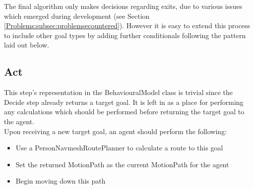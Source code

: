 The final algorithm only makes decisions regarding exits, due to various issues which emerged during development (see Section \ref{Problems:subsec:problemsecountered}). However it is easy to extend this process to include other goal types by adding further conditionals following the pattern laid out below.\\

\begin{algorithm}[H]
 \SetAlgoLined
\end{algorithm}

\subsection{Act}
\label{Imp:subsec:act}
This step's representation in the BehaviouralModel class is trivial since the Decide step already returns a target goal. It is left in as a place for performing any calculations which should be performed before returning the target goal to the agent.\\
Upon receiving a new target goal, an agent should perform the following:
\begin{itemize}
\item{Use a PersonNavmeshRoutePlanner to calculate a route to this goal}
\item{Set the returned MotionPath as the current MotionPath for the agent}
\item{Begin moving down this path}
\end{itemize}




%
     
     
 

    

